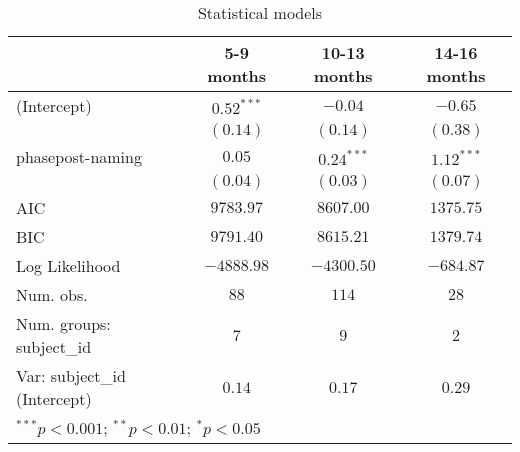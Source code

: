 
\begin{table}
\begin{center}
\begin{tabular}{l c c c}
\hline
 & 5-9 months & 10-13 months & 14-16 months \\
\hline
(Intercept)                  & $0.52^{***}$ & $-0.04$      & $-0.65$      \\
                             & $(0.14)$     & $(0.14)$     & $(0.38)$     \\
phasepost-naming             & $0.05$       & $0.24^{***}$ & $1.12^{***}$ \\
                             & $(0.04)$     & $(0.03)$     & $(0.07)$     \\
\hline
AIC                          & $9783.97$    & $8607.00$    & $1375.75$    \\
BIC                          & $9791.40$    & $8615.21$    & $1379.74$    \\
Log Likelihood               & $-4888.98$   & $-4300.50$   & $-684.87$    \\
Num. obs.                    & $88$         & $114$        & $28$         \\
Num. groups: subject\_id     & $7$          & $9$          & $2$          \\
Var: subject\_id (Intercept) & $0.14$       & $0.17$       & $0.29$       \\
\hline
\multicolumn{4}{l}{\scriptsize{$^{***}p<0.001$; $^{**}p<0.01$; $^{*}p<0.05$}}
\end{tabular}
\caption{Statistical models}
\label{table:coefficients}
\end{center}
\end{table}

